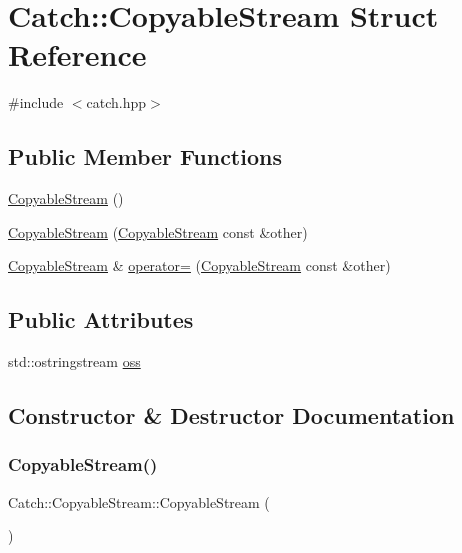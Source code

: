 \hypertarget{struct_catch_1_1_copyable_stream}{}\section{Catch\+:\+:Copyable\+Stream Struct Reference}
\label{struct_catch_1_1_copyable_stream}


{\ttfamily \#include $<$catch.\+hpp$>$}

\subsection*{Public Member Functions}
\begin{DoxyCompactItemize}
\item 
\hyperlink{struct_catch_1_1_copyable_stream_a5a61d0da675ae00cd46efaef4c445cdd}{Copyable\+Stream} ()
\item 
\hyperlink{struct_catch_1_1_copyable_stream_a0e72dc16240653f52c17106f4bf34da8}{Copyable\+Stream} (\hyperlink{struct_catch_1_1_copyable_stream}{Copyable\+Stream} const \&other)
\item 
\hyperlink{struct_catch_1_1_copyable_stream}{Copyable\+Stream} \& \hyperlink{struct_catch_1_1_copyable_stream_a1760fa29b38011c5845171260bec0966}{operator=} (\hyperlink{struct_catch_1_1_copyable_stream}{Copyable\+Stream} const \&other)
\end{DoxyCompactItemize}
\subsection*{Public Attributes}
\begin{DoxyCompactItemize}
\item 
std\+::ostringstream \hyperlink{struct_catch_1_1_copyable_stream_ae123fb4d673e7d7a13a3c5f6bc5d426c}{oss}
\end{DoxyCompactItemize}


\subsection{Constructor \& Destructor Documentation}
\hypertarget{struct_catch_1_1_copyable_stream_a5a61d0da675ae00cd46efaef4c445cdd}{}\label{struct_catch_1_1_copyable_stream_a5a61d0da675ae00cd46efaef4c445cdd} 
\subsubsection{\texorpdfstring{Copyable\+Stream()}{CopyableStream()}\hspace{0.1cm}{\footnotesize\ttfamily [1/2]}}
{\footnotesize\ttfamily Catch\+::\+Copyable\+Stream\+::\+Copyable\+Stream (\begin{DoxyParamCaption}{ }\end{DoxyParamCaption})\hspace{0.3cm}{\ttfamily [inline]}}

